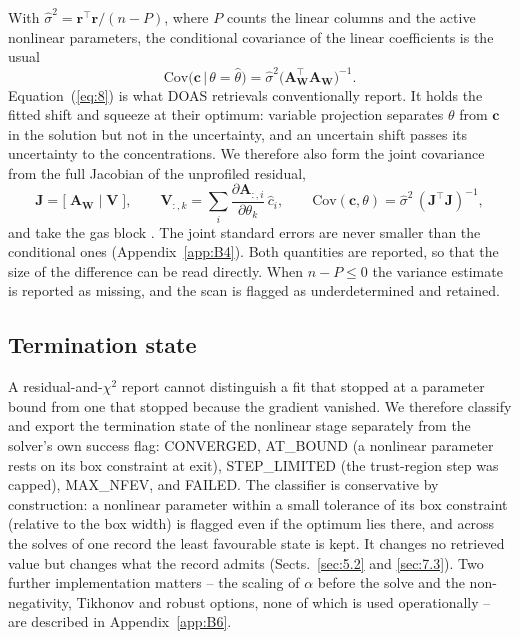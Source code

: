 With $\hat{\sigma}^2 = \mathbf{r}^{\!\top}\mathbf{r}/(n-P)$, where $P$ counts the
linear columns and the active nonlinear parameters, the conditional covariance of the
linear coefficients is the usual
\begin{equation}
\mathrm{Cov}\bigl(\mathbf{c}\,\big|\,\theta=\hat\theta\bigr)
=\hat{\sigma}^2\bigl(\mathbf{A}_{\mathbf{W}}^{\top}\mathbf{A}_{\mathbf{W}}\bigr)^{-1}.
\label{eq:8}
\end{equation}
Equation~(\ref{eq:8}) is what DOAS retrievals conventionally report. It holds the fitted shift and squeeze at
their optimum: variable projection separates $\theta$ from $\mathbf{c}$ in the solution but not in the
uncertainty, and an uncertain shift passes its uncertainty to the concentrations. We therefore also form the
joint covariance from the full Jacobian of the unprofiled residual,
\begin{equation}
\mathbf{J}=\bigl[\;\mathbf{A}_{\mathbf{W}}\;\big|\;\mathbf{V}\;\bigr],
\qquad
\mathbf{V}_{:,k}=\sum_i \frac{\partial \mathbf{A}_{:,i}}{\partial \theta_k}\,\hat{c}_i,
\qquad
\mathrm{Cov}(\mathbf{c},\theta)=\hat{\sigma}^2\,(\mathbf{J}^{\top}\mathbf{J})^{-1},
\label{eq:9}
\end{equation}
and take the gas block \citep{OLeary_2013}. The joint standard errors are never smaller than the conditional
ones (Appendix~\ref{app:B4}). Both quantities are reported, so that the size of the difference can be read
directly. When $n-P\le 0$ the variance estimate is reported as missing, and the scan is flagged as
underdetermined and retained.

\subsection{Termination state}
\label{sec:2.6}

A residual-and-$\chi^2$ report cannot distinguish a fit that stopped at a parameter bound from one that stopped
because the gradient vanished. We therefore classify and export the termination state of the
nonlinear stage separately from the solver's own success flag: CONVERGED, AT\_BOUND
(a nonlinear parameter rests on its box constraint at exit), STEP\_LIMITED (the
trust-region step was capped), MAX\_NFEV, and FAILED. The classifier is conservative by construction: a
nonlinear parameter within a small tolerance of its box constraint (relative to the box width) is flagged even if
the optimum lies there, and across the solves of one record the least favourable state is kept. It changes no
retrieved value but changes what the record admits (Sects.~\ref{sec:5.2} and \ref{sec:7.3}). Two further implementation matters -- the scaling of $\alpha$ before the solve and the
non-negativity, Tikhonov and robust options, none of which is used operationally -- are described in
Appendix~\ref{app:B6}.

